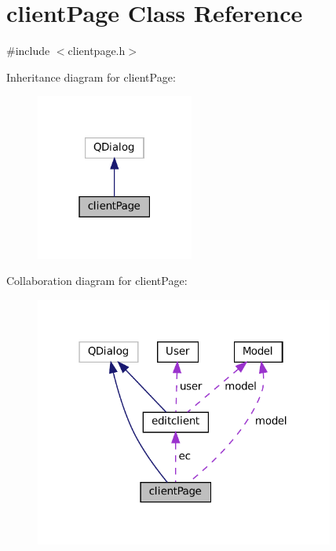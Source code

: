 \hypertarget{classclientPage}{}\section{client\+Page Class Reference}
\label{classclientPage}


{\ttfamily \#include $<$clientpage.\+h$>$}



Inheritance diagram for client\+Page\+:
\nopagebreak
\begin{figure}[H]
\begin{center}
\leavevmode
\includegraphics[width=147pt]{classclientPage__inherit__graph}
\end{center}
\end{figure}


Collaboration diagram for client\+Page\+:
\nopagebreak
\begin{figure}[H]
\begin{center}
\leavevmode
\includegraphics[width=279pt]{classclientPage__coll__graph}
\end{center}
\end{figure}
